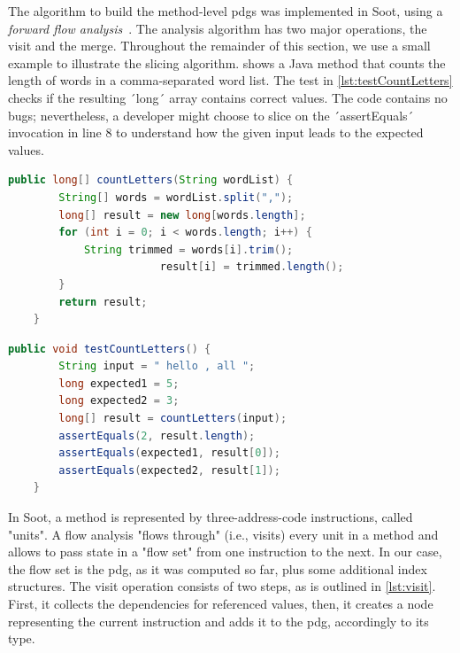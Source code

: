 The algorithm to build the method-level \acp{pdg} was implemented in Soot, using a \emph{forward flow analysis}~\cite{lam11:the_soot_framework}.
The analysis algorithm has two major operations, the visit and the merge.
Throughout the remainder of this section, we use a small example to illustrate the slicing algorithm.
 shows a Java method that counts the length of words in a comma-separated word list.
The test in \cref{lst:testCountLetters} checks if the resulting ´long´ array contains correct values.
The code contains no bugs; nevertheless, a developer might choose to slice on the ´assertEquals´ invocation in line 8 to understand how the given input leads to the expected values.

\begin{lstlisting}[float,caption={A method to count letters in a word list.},stepnumber=2,numberfirstline=false,label=lst:countLetters,language=Java]
    public long[] countLetters(String wordList) {
        String[] words = wordList.split(",");
        long[] result = new long[words.length];
        for (int i = 0; i < words.length; i++) {
            String trimmed = words[i].trim();
						result[i] = trimmed.length();
        }
        return result;
    }
\end{lstlisting}

\begin{lstlisting}[float,caption={A test for countLetters.},stepnumber=2,numberfirstline=false,label=lst:testCountLetters,language=Java]
    public void testCountLetters() {
        String input = " hello , all ";
        long expected1 = 5;
        long expected2 = 3;
        long[] result = countLetters(input);
        assertEquals(2, result.length);
        assertEquals(expected1, result[0]);
        assertEquals(expected2, result[1]);
    }
\end{lstlisting}


In Soot, a method is represented by three-address-code instructions, called "units".
A flow analysis "flows through" (i.e., visits) every unit in a method and allows to pass state in a "flow set" from one instruction to the next.
In our case, the flow set is the \ac{pdg}, as it was computed so far, plus some additional index structures.
The visit operation consists of two steps, as is outlined in \cref{lst:visit}.
First, it collects the dependencies for referenced values, 
then, it creates a node representing the current instruction and adds it to the \ac{pdg}, accordingly to its type.

